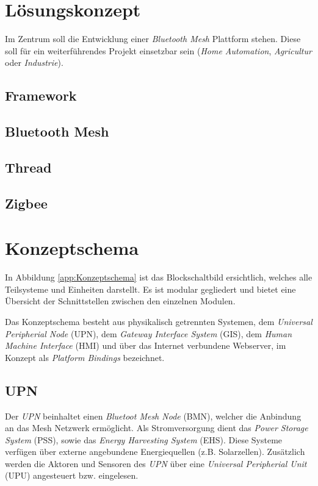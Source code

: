 \clearpage
\section{Lösungskonzept}\label{sec:Loesungskonzept}
Im Zentrum soll die Entwicklung einer \textit{Bluetooth Mesh} Plattform stehen. Diese soll für ein weiterführendes Projekt einsetzbar sein (\textit{Home Automation}, \textit{Agricultur} oder \textit{Industrie}). 

\subsection{Framework}\label{subsec:Framework}  

\subsection{Bluetooth Mesh}\label{subsec:Bluetooth Mesh}  

\subsection{Thread}\label{subsec:Thread}  

\subsection{Zigbee}\label{subsec:Zigbee}  


\section{Konzeptschema}\label{sec:Konzeptschema}

In Abbildung \ref{app:Konzeptschema} ist das Blockschaltbild ersichtlich, welches alle Teilsysteme und Einheiten darstellt. Es ist modular gegliedert und bietet eine Übersicht der Schnittstellen zwischen den einzelnen Modulen. 

Das Konzeptschema besteht aus physikalisch getrennten Systemen, dem \textit{Universal Peripherial Node} (UPN), dem \textit{Gateway Interface System} (GIS), dem \textit{Human Machine Interface} (HMI) und über das Internet verbundene Webserver, im Konzept als \textit{Platform Bindings} bezeichnet.

\subsection{UPN}\label{sec:Konzeptschema_UPN}  

Der \textit{UPN} beinhaltet einen \textit{Bluetoot Mesh Node} (BMN), welcher die Anbindung an das Mesh Netzwerk ermöglicht. Als Stromversorgung dient das \textit{Power Storage System} (PSS), sowie das \textit{Energy Harvesting System} (EHS). Diese Systeme verfügen über externe angebundene Energiequellen (z.B. Solarzellen). Zusätzlich werden die Aktoren und Sensoren des \textit{UPN} über eine \textit{Universal Peripherial Unit} (UPU) angesteuert bzw. eingelesen.

